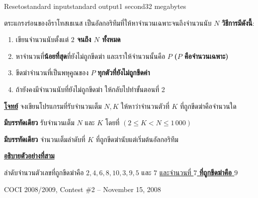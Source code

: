 \documentclass[11pt,a4paper]{article}
\begin{document}
\begin{problem}{Reseto}{standard input}{standard output}{1 second}{32 megabytes}

ตระแกรงร่อนของอีราโทสเธเนส เป็นอัลกอริทึมที่ให้หาจำนวนเฉพาะจนถึงจำนวนนับ $N$ \textbf{วิธีการมีดังนี้}:

\begin{enumerate}
\item เขียนจำนวนนับตั้งแต่ \textbf{$2$ จนถึง $N$ ทั้งหมด}
\item หาจำนวนที่\textbf{น้อยที่สุด}ที่ยังไม่ถูกขีดฆ่า และเราให้จำนวนนั้นคือ $P$\textbf{ ($P$ คือจำนวนเฉพาะ)}
\item ขีดฆ่าจำนวนที่เป็นพหุคูณของ $P$ \textbf{ทุกตัวที่ยังไม่ถูกขีดค่า}
\item ถ้ายังคงมีจำนวนนับที่ยังไม่ถูกขีดฆ่า ให้กลับไปทำขั้นตอนที่ 2
\end{enumerate}

\underline{\textbf{โจทย์}} จงเขียนโปรแกรมที่รับจำนวนเต็ม $N, K$ ให้หาว่าจำนวนตัวที่ $K$ ที่ถูกขีดฆ่าคือจำนวนใด

\InputFile

\textbf{มีบรรทัดเดียว} รับจำนวนเต็ม $N$ และ $K$ โดยที่ $(2 \leq K < N \leq 1\,000)$

\OutputFile

\textbf{มีบรรทัดเดียว} จำนวนเต็มลำดับที่ $K$ ที่ถูกขีดฆ่านับแต่เริ่มต้นอัลกอริทึม

\Examples

\begin{example}
%
%
%
\end{example}

\Note

\underline{\textbf{อธิบายตัวอย่างที่สาม}}

ลำดับจำนวนตัวเลขที่ถูกขีดฆ่าคือ $2, 4, 6, 8, 10, 3, 9, 5$ และ $7$ \underline{และจำนวนที่ $7$ \textbf{ที่}}\textbf{ถู}\underline{\textbf{กขีดฆ่าคือ $9$}}

\Source

COCI 2008/2009, Contest \#2 – November 15, 2008



\end{problem}
\end{document}
